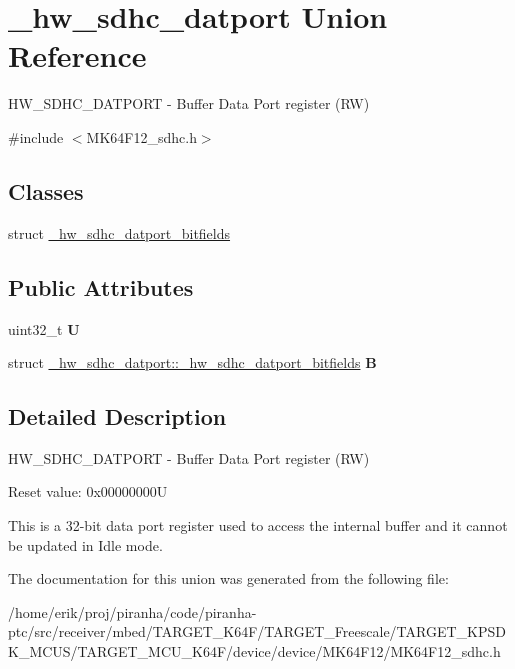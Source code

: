 \hypertarget{union__hw__sdhc__datport}{}\section{\+\_\+hw\+\_\+sdhc\+\_\+datport Union Reference}
\label{union__hw__sdhc__datport}


H\+W\+\_\+\+S\+D\+H\+C\+\_\+\+D\+A\+T\+P\+O\+RT -\/ Buffer Data Port register (RW)  




{\ttfamily \#include $<$M\+K64\+F12\+\_\+sdhc.\+h$>$}

\subsection*{Classes}
\begin{DoxyCompactItemize}
\item 
struct \hyperlink{struct__hw__sdhc__datport_1_1__hw__sdhc__datport__bitfields}{\+\_\+hw\+\_\+sdhc\+\_\+datport\+\_\+bitfields}
\end{DoxyCompactItemize}
\subsection*{Public Attributes}
\begin{DoxyCompactItemize}
\item 
uint32\+\_\+t {\bfseries U}\hypertarget{union__hw__sdhc__datport_afa375fd4f787a11d779ee8ac0a23388b}{}\label{union__hw__sdhc__datport_afa375fd4f787a11d779ee8ac0a23388b}

\item 
struct \hyperlink{struct__hw__sdhc__datport_1_1__hw__sdhc__datport__bitfields}{\+\_\+hw\+\_\+sdhc\+\_\+datport\+::\+\_\+hw\+\_\+sdhc\+\_\+datport\+\_\+bitfields} {\bfseries B}\hypertarget{union__hw__sdhc__datport_abd32e5850b00782bd0d2f56bd72837c8}{}\label{union__hw__sdhc__datport_abd32e5850b00782bd0d2f56bd72837c8}

\end{DoxyCompactItemize}


\subsection{Detailed Description}
H\+W\+\_\+\+S\+D\+H\+C\+\_\+\+D\+A\+T\+P\+O\+RT -\/ Buffer Data Port register (RW) 

Reset value\+: 0x00000000U

This is a 32-\/bit data port register used to access the internal buffer and it cannot be updated in Idle mode. 

The documentation for this union was generated from the following file\+:\begin{DoxyCompactItemize}
\item 
/home/erik/proj/piranha/code/piranha-\/ptc/src/receiver/mbed/\+T\+A\+R\+G\+E\+T\+\_\+\+K64\+F/\+T\+A\+R\+G\+E\+T\+\_\+\+Freescale/\+T\+A\+R\+G\+E\+T\+\_\+\+K\+P\+S\+D\+K\+\_\+\+M\+C\+U\+S/\+T\+A\+R\+G\+E\+T\+\_\+\+M\+C\+U\+\_\+\+K64\+F/device/device/\+M\+K64\+F12/M\+K64\+F12\+\_\+sdhc.\+h\end{DoxyCompactItemize}
